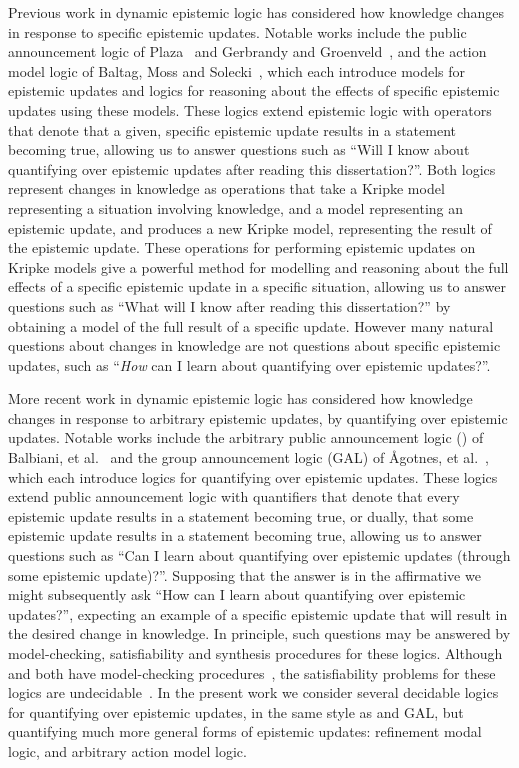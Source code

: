 Previous work in dynamic epistemic logic has considered how knowledge changes in response to specific epistemic updates.
Notable works include the public announcement logic of Plaza~\cite{plaza:1989} and Gerbrandy and Groenveld~\cite{gerbrandy:1997}, and the action model logic of Baltag, Moss and Solecki~\cite{baltag:1998,baltag:2004}, which each introduce models for epistemic updates and logics for reasoning about the effects of specific epistemic updates using these models.
These logics extend epistemic logic with operators that denote that a given, specific epistemic update results in a statement becoming true, allowing us to answer questions such as ``Will I know about quantifying over epistemic updates after reading this dissertation?''.
Both logics represent changes in knowledge as operations that take a Kripke model representing a situation involving knowledge, and a model representing an epistemic update, and produces a new Kripke model, representing the result of the epistemic update.
These operations for performing epistemic updates on Kripke models give a powerful method for modelling and reasoning about the full effects of a specific epistemic update in a specific situation, allowing us to answer questions such as ``What will I know after reading this dissertation?'' by obtaining a model of the full result of a specific update.
However many natural questions about changes in knowledge are not questions about specific epistemic updates, such as ``{\em How} can I learn about quantifying over epistemic updates?''.

More recent work in dynamic epistemic logic has considered how knowledge changes in response to arbitrary epistemic updates, by quantifying over epistemic updates.
Notable works include the arbitrary public announcement logic (\logicApal{}) of Balbiani, et al.~\cite{balbiani:2007} and the group announcement logic (GAL) of {\AA}gotnes, et al.~\cite{agotnes:2008,agotnes:2010}, which each introduce logics for quantifying over epistemic updates.
These logics extend public announcement logic with quantifiers that denote that every epistemic update results in a statement becoming true, or dually, that some epistemic update results in a statement becoming true, allowing us to answer questions such as ``Can I learn about quantifying over epistemic updates (through some epistemic update)?''.
Supposing that the answer is in the affirmative we might subsequently ask ``How can I learn about quantifying over epistemic updates?'', expecting an example of a specific epistemic update that will result in the desired change in knowledge.
In principle, such questions may be answered by model-checking, satisfiability and synthesis procedures for these logics.
Although \logicApal{} and \logicGal{} both have model-checking procedures~\cite{agotnes:2010}, the satisfiability problems for these logics are undecidable~\cite{agotnes:2014}.
In the present work we consider several decidable logics for quantifying over epistemic updates, in the same style as \logicApal{} and GAL, but quantifying much more general forms of epistemic updates: refinement modal logic, and arbitrary action model logic.

